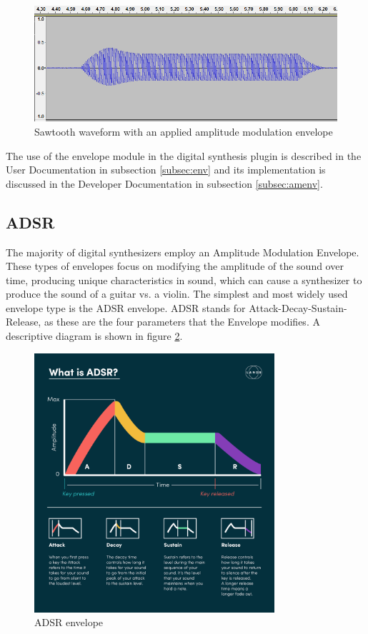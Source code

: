 \documentclass[a4paper,12pt]{report}
\begin{document}
\begin{figure}
    \centering
    \includegraphics[width=36em]{ADSRWaveform.png}
    \caption{Sawtooth waveform with an applied amplitude modulation envelope}
    \label{fig:ADSRWaveform}
\end{figure}

The use of the envelope module in the digital synthesis plugin is described in the User Documentation in subsection \ref{subsec:env} and its implementation is discussed in the Developer Documentation in subsection \ref{subsec:amenv}.

\subsection{ADSR}
\label{subsec:adsr}
The majority of digital synthesizers employ an Amplitude Modulation Envelope. These types of envelopes focus on modifying the amplitude of the sound over time, producing unique characteristics in sound, which can cause a synthesizer to produce the sound of a guitar vs. a violin. The simplest and most widely used envelope type is the ADSR envelope. ADSR stands for Attack-Decay-Sustain-Release, as these are the four parameters that the Envelope modifies. A descriptive diagram is shown in figure \ref{fig:ADSRExplained}.

\begin{figure}
    \centering
    \includegraphics[width=24em]{ADSRExplained.jpg}
    \caption{ADSR envelope}
    \label{fig:ADSRExplained}
\end{figure}
\end{document}

